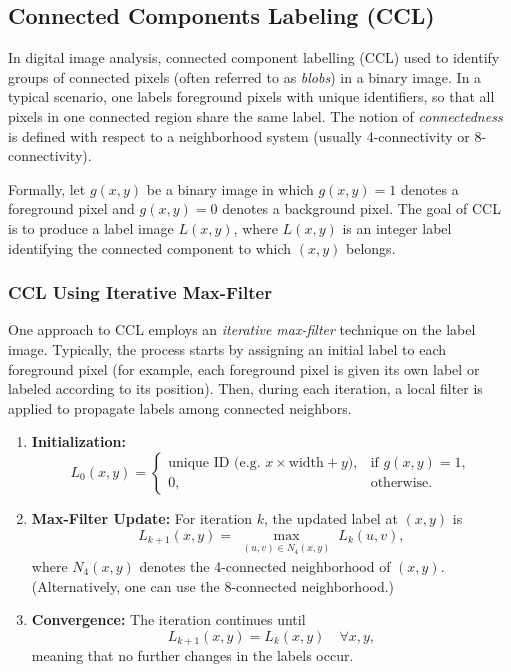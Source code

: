 \documentclass[a4paper,12pt]{article}
\begin{document}
\subsection{Connected Components Labeling (CCL)}

In digital image analysis, connected component labelling (CCL) used to identify groups of connected pixels (often referred to as \emph{blobs}) in a binary image. In a typical scenario, one labels foreground pixels with unique identifiers, so that all pixels in one connected region share the same label. The notion of \emph{connectedness} is defined with respect to a neighborhood system (usually 4-connectivity or 8-connectivity).

Formally, let \(g(x, y)\) be a binary image in which \(g(x, y) = 1\) denotes a foreground pixel and \(g(x, y) = 0\) denotes a background pixel. The goal of CCL is to produce a label image \(L(x, y)\), where \(L(x, y)\) is an integer label identifying the connected component to which \((x, y)\) belongs.

\subsubsection{CCL Using Iterative Max-Filter}

One approach to CCL employs an \emph{iterative max-filter} technique on the label image. Typically, the process starts by assigning an initial label to each foreground pixel (for example, each foreground pixel is given its own label or labeled according to its position). Then, during each iteration, a local filter is applied to propagate labels among connected neighbors.

\begin{enumerate}
    \item \textbf{Initialization:}
    \[
    L_0(x, y) = 
    \begin{cases}
    \text{unique ID (e.g. } x \times \text{width} + y), & \text{if } g(x, y) = 1, \\
    0, & \text{otherwise}.
    \end{cases}
    \]
    \item \textbf{Max-Filter Update:} For iteration \(k\), the updated label at \((x, y)\) is 
    \[
    L_{k+1}(x, y) = 
    \max_{\substack{(u, v) \in N_4(x, y)}} L_k(u, v),
    \]
    where \(N_4(x, y)\) denotes the 4-connected neighborhood of \((x, y)\). (Alternatively, one can use the 8-connected neighborhood.)
    \item \textbf{Convergence:} The iteration continues until 
    \[
    L_{k+1}(x, y) = L_k(x, y) \quad \forall x, y,
    \]
    meaning that no further changes in the labels occur.
\end{enumerate}
\end{document}
